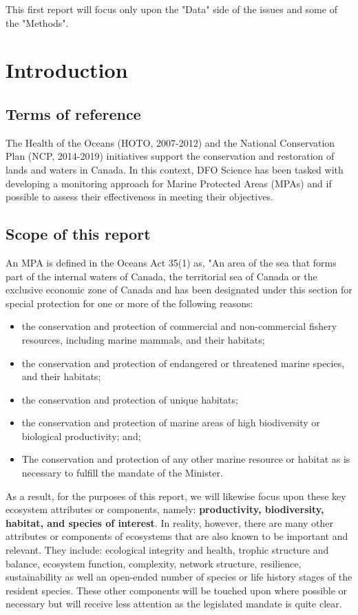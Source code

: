 \documentclass[letterpaper,portrait,11pt]{scrartcl}
\numberwithin{equation}{section}		%
\numberwithin{figure}{section}		%
\numberwithin{table}{section}				%
\begin{document}
This first report will focus only upon the "Data" side of the issues and some of the "Methods". 


\section{Introduction}

\subsection{Terms of reference}
The Health of the Oceans (HOTO, 2007-2012) and the National Conservation Plan (NCP, 2014-2019) initiatives support the conservation and restoration of lands and waters in Canada. In this context, DFO Science has been tasked with developing a monitoring approach for Marine Protected Areas (MPAs) and if possible to assess their effectiveness in meeting their objectives. 

\subsection{Scope of this report}
An MPA is defined in the Oceans Act 35(1) as, "An area of the sea that forms part of the internal waters of Canada, the territorial sea of Canada or the exclusive economic zone of Canada and has been designated under this section for special protection for one or more of the following reasons: 

\begin{itemize}
  \item the conservation and protection of commercial and non-commercial fishery resources, including marine mammals, and their habitats; 
  \item the conservation and protection of endangered or threatened marine species, and their habitats; 
  \item the conservation and protection of unique habitats; 
  \item the conservation and protection of marine areas of high biodiversity or biological productivity; and; 
  \item The conservation and protection of any other marine resource or habitat as is necessary to fulfill the mandate of the Minister.
\end{itemize}

As a result, for the purposes of this report, we will likewise focus upon these key ecosystem attributes or components, namely: \textbf{productivity, biodiversity, habitat, and  species of interest}. In reality, however, there are many other attributes or components of ecosystems that are also known to be important and relevant. They include: ecological integrity and health, trophic structure and balance, ecosystem function, complexity, network structure, resilience, sustainability as well an open-ended number of species or life history stages of the resident species. These other components will be touched upon where possible or necessary but will receive less attention as the legislated mandate is quite clear. 
\end{document}
